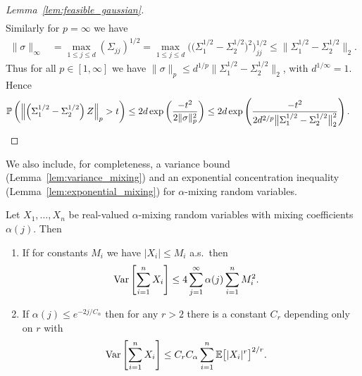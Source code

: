 \begin{proof}[Lemma~\ref{lem:feasible_gaussian}]
\begin{align*}
  \end{align*}
  Similarly for $p = \infty$ we have
  \begin{align*}
    \|\sigma\|_\infty
    &=
    \max_{1 \leq j \leq d}
    (\Sigma_{j j})^{1/2}
    =
    \max_{1 \leq j \leq d}
    \Big(\big(\Sigma_1^{1/2} - \Sigma_2^{1/2}\big)^2\Big)_{j j}^{1/2}
    \leq
    \big\|\Sigma_1^{1/2} - \Sigma_2^{1/2}\big\|_2.
  \end{align*}
  Thus for all $p \in [1, \infty]$ we have
  $\|\sigma\|_p \leq
  d^{1/p} \big\|\Sigma_1^{1/2} - \Sigma_2^{1/2}\big\|_2$,
  with $d^{1/\infty} = 1$. Hence
  \begin{align*}
    \P\left(
      \left\|
      \left(\Sigma_1^{1/2} - \Sigma_2^{1/2}\right) Z
      \right\|_p
      > t
    \right)
    &\leq
    2 d \exp \left( \frac{-t^2}{2 \|\sigma\|_p^2} \right)
    \leq
    2 d \exp \left(
      \frac{-t^2}
      {2 d^{2/p} \big\|\Sigma_1^{1/2} - \Sigma_2^{1/2}\big\|_2^2}
    \right).
  \end{align*}
\end{proof}

We also include, for completeness, a variance bound
(Lemma~\ref{lem:variance_mixing})
and an exponential concentration inequality
(Lemma~\ref{lem:exponential_mixing})
for $\alpha$-mixing random variables.

\begin{lemma}
  \label{lem:variance_mixing}

  Let $X_1, \ldots, X_n$ be
  real-valued $\alpha$-mixing random
  variables with mixing coefficients $\alpha(j)$.
  Then
  \begin{enumerate}[label=(\roman*)]

    \item
      \label{eq:variance_mixing_bounded}
      If for constants $M_i$ we have
      $|X_i| \leq M_i$ a.s.\ then
      \begin{align*}
        \Var\left[
          \sum_{i=1}^n X_i
        \right]
        &\leq
        4 \sum_{j=1}^\infty \alpha(j)
        \sum_{i=1}^n M_i^2.
      \end{align*}

    \item
      \label{eq:variance_mixing_exponential}
      If $\alpha(j) \leq e^{-2j / C_\alpha}$ then
      for any $r>2$ there is a constant
      $C_r$ depending only on $r$ with
      \begin{align*}
        \Var\left[
          \sum_{i=1}^n X_i
        \right]
        &\leq
        C_r C_\alpha
        \sum_{i=1}^n
        \E\big[|X_i|^r\big]^{2/r}.
      \end{align*}
  \end{enumerate}
\end{lemma}

